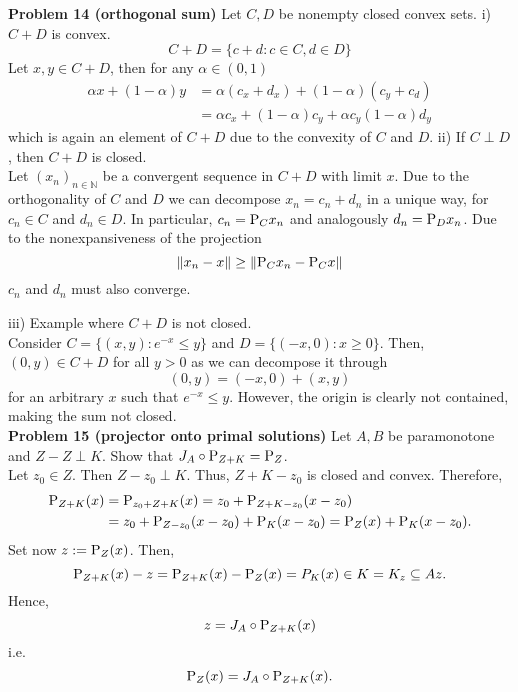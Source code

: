 \documentclass{scrartcl}
\newcommand{\N}{\mathbb{N}}
\newcommand{\sub}{\subseteq}
\theoremstyle{plain}
\theoremstyle{remark}
\renewcommand{\P}{\textup{P}}
\begin{document}
\textbf{Problem 14 (orthogonal sum)} Let $C, D$ be nonempty closed convex sets.
i) $C+D$ is convex.
\begin{equation}
  C+D = \{c+d : c \in C, d \in D\}
\end{equation}
Let $x,y \in C+D$, then for any $\alpha \in (0,1)$
\begin{equation}
  \begin{aligned}
    \alpha x+ (1 -\alpha)y &= \alpha(c_x + d_x) + (1-\alpha)(c_y + c_d)\\
    &= \alpha c_x + (1-\alpha) c_y + \alpha c_y (1-\alpha) d_y
  \end{aligned}
\end{equation}
which is again an element of $C+D$ due to the convexity of $C$ and $D$.
ii) If $C \perp D$, then $C+D$ is closed. \\
Let $(x_{n})_{n \in \N}$ be a convergent sequence in $C+D$ with limit $x$. Due to the orthogonality of $C$ and $D$ we can decompose $x_{n} = c_{n} + d_{n}$ in a unique way, for $c_{n} \in C$ and $d_{n} \in D$. In particular, $c_{n} = \P_{C}x_{n}$ and analogously $d_{n} = \P_{D}x_{n}$. Due to the nonexpansiveness of the projection 
\begin{equation}
  \lVert x_{n} - x \rVert \ge \lVert \P_{C}x_{n} - \P_{C}x \rVert
\end{equation}$c_{n}$ and $d_{n}$ must also converge.

iii) Example where $C+D$ is not closed.\\
Consider $C=\{(x,y) : e^{-x} \le y\}$ and $D = \{(-x,0) : x \ge 0\}$. Then, $(0, y) \in C+D$ for all $y>0$ as we can decompose it through
\begin{equation}
  (0, y) = (-x, 0) + (x, y)
\end{equation}
for an arbitrary $x$ such that $e^{-x} \le y$. However, the origin is clearly not contained, making the sum not closed.\\

\textbf{Problem 15 (projector onto primal solutions)} Let $A,B$ be paramonotone and $Z-Z \perp K$. Show that $J_A \circ \P_{Z+K} = \P_Z$.\\
Let $z_0 \in Z$. Then $Z-z_0 \perp K$. Thus, $Z+K -z_0$ is closed and convex.
Therefore,
\begin{equation}
  \begin{aligned}
    \P_{Z+K}(x) &= \P_{z_0+ Z+K}(x) = z_0 + \P_{Z+K-z_0}(x-z_0) \\
    &= z_0 + \P_{Z-z_0}(x-z_0) + \P_{K}(x-z_0) = \P_Z(x) + \P_K(x-z_0).
  \end{aligned}
\end{equation}
Set now $z := \P_Z(x)$.
Then,
\begin{equation}
  \P_{Z+K}(x) - z = \P_{Z+K}(x) - \P_Z(x) = P_K(x) \in K = K_z \sub Az.
\end{equation}
Hence,
\begin{equation}
  z = J_A \circ \P_{Z+K}(x)
\end{equation}
i.e.
\begin{equation}
  \P_Z(x) = J_A \circ \P_{Z+K}(x).
\end{equation}
\end{document}
